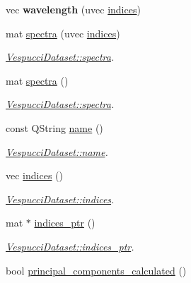\begin{DoxyCompactItemize}
\item 
\hypertarget{class_vespucci_dataset_a9b3854cdf3cba2b2d02f157a6224bea2}{vec {\bfseries wavelength} (uvec \hyperlink{class_vespucci_dataset_a7472b4eb9f6ea7245ed544287ebe4a8b}{indices})}\label{class_vespucci_dataset_a9b3854cdf3cba2b2d02f157a6224bea2}

\item 
mat \hyperlink{class_vespucci_dataset_a536a8837c5a2ad10a0bb3577f8741ee2}{spectra} (uvec \hyperlink{class_vespucci_dataset_a7472b4eb9f6ea7245ed544287ebe4a8b}{indices})
\begin{DoxyCompactList}\small\item\em \hyperlink{class_vespucci_dataset_a536a8837c5a2ad10a0bb3577f8741ee2}{Vespucci\+Dataset\+::spectra}. \end{DoxyCompactList}\item 
mat \hyperlink{class_vespucci_dataset_a8b1186c4bff0d513c336d7a48861777f}{spectra} ()
\begin{DoxyCompactList}\small\item\em \hyperlink{class_vespucci_dataset_a536a8837c5a2ad10a0bb3577f8741ee2}{Vespucci\+Dataset\+::spectra}. \end{DoxyCompactList}\item 
const Q\+String \hyperlink{class_vespucci_dataset_ae5b30cb466acfdf741b360bc4f897cc9}{name} ()
\begin{DoxyCompactList}\small\item\em \hyperlink{class_vespucci_dataset_ae5b30cb466acfdf741b360bc4f897cc9}{Vespucci\+Dataset\+::name}. \end{DoxyCompactList}\item 
vec \hyperlink{class_vespucci_dataset_a7472b4eb9f6ea7245ed544287ebe4a8b}{indices} ()
\begin{DoxyCompactList}\small\item\em \hyperlink{class_vespucci_dataset_a7472b4eb9f6ea7245ed544287ebe4a8b}{Vespucci\+Dataset\+::indices}. \end{DoxyCompactList}\item 
mat $\ast$ \hyperlink{class_vespucci_dataset_ab0db3c7619e32824b893878fd6d31ba5}{indices\+\_\+ptr} ()
\begin{DoxyCompactList}\small\item\em \hyperlink{class_vespucci_dataset_ab0db3c7619e32824b893878fd6d31ba5}{Vespucci\+Dataset\+::indices\+\_\+ptr}. \end{DoxyCompactList}\item 
bool \hyperlink{class_vespucci_dataset_a8f9cb5f4e13fd2cb40b88907213d671a}{principal\+\_\+components\+\_\+calculated} ()

\end{DoxyCompactItemize}
